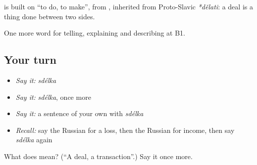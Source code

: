 \begin{cousinweb}
\textbf{} is built on \emph{} \textquotedblleft{}to do, to make\textquotedblright{}, from \emph{}, inherited from Proto-Slavic \emph{*dělati}: a deal is a thing done between two sides.
\end{cousinweb}

\begin{grammarlens}[title={What you've built}]
One more word for telling, explaining and describing at B1.
\end{grammarlens}

\subsection*{Your turn}
\begin{itemize}
\raggedright
  \item \emph{Say it:} \emph{sdélka}
  \item \emph{Say it:} \emph{sdélka}, once more
  \item \emph{Say it:} a sentence of your own with \emph{sdélka}
  \item \emph{Recall:} say the Russian for a loss, then the Russian for income, then say \emph{sdélka} again
\end{itemize}

\begin{tcolorbox}[breakable,colback=teal!4,colframe=teal!35!black,title={Before you move on}]
What does  mean? (\textquotedblleft{}A deal, a transaction\textquotedblright{}.) Say it once more.
\end{tcolorbox}

